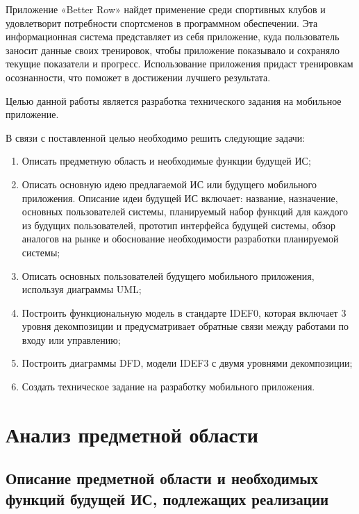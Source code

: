 \documentclass[14pt]{extreport}
\begin{document}
Приложение «Better Row» найдет применение среди спортивных клубов и удовлетворит потребности спортсменов в программном обеспечении. Эта информационная система представляет из себя приложение, куда пользователь заносит данные своих тренировок, чтобы приложение показывало и сохраняло текущие показатели и прогресс. Использование приложения придаст тренировкам осознанности, что поможет в достижении лучшего результата.

Целью данной работы является разработка технического задания на мобильное приложение.

В связи с поставленной целью необходимо решить следующие задачи:

\begin{enumerate}

\item Описать предметную область и необходимые функции будущей ИС;

\item Описать основную идею предлагаемой ИС или будущего мобильного приложения. Описание идеи будущей ИС включает: название, назначение, основных пользователей системы, планируемый набор функций для каждого из будущих пользователей, прототип интерфейса будущей системы, обзор аналогов на рынке и обоснование необходимости разработки планируемой системы;

\item Описать основных пользователей будущего мобильного приложения, используя диаграммы UML;

\item Построить функциональную модель в стандарте IDEF0, которая включает 3 уровня декомпозиции и предусматривает обратные связи между работами по входу или управлению;

\item Построить диаграммы DFD, модели IDEF3 с двумя уровнями декомпозиции;

\item Создать техническое задание на разработку мобильного приложения.

\end{enumerate}

\chapter{Анализ предметной области}

\section{Описание предметной области и необходимых функций будущей ИС, подлежащих реализации}
\end{document}
